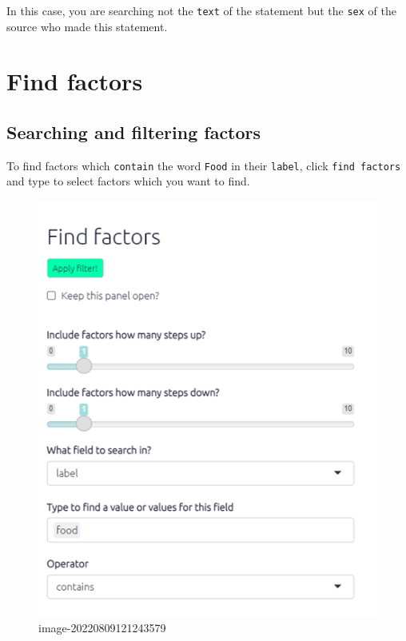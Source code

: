 \documentclass[
]{book}
\begin{document}
In this case, you are searching not the \texttt{text} of the statement but the \texttt{sex} of the source who made this statement.

\hypertarget{find-factors}{%
\section{Find factors}\label{find-factors}}

\hypertarget{searching-and-filtering-factors}{%
\subsection{Searching and filtering factors}\label{searching-and-filtering-factors}}

To find factors which \texttt{contain} the word \texttt{Food} in their \texttt{label}, click \texttt{find\ factors} and type to select factors which you want to find.

\begin{figure}
\centering
\includegraphics[width=6.77083in,height=\textheight]{_assets/image-20220809121243579.png}
\caption{image-20220809121243579}
\end{figure}
\end{document}
